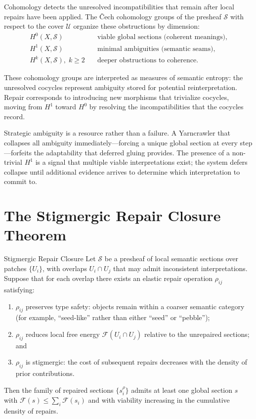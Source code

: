 Cohomology detects the unresolved incompatibilities that remain after local
repairs have been applied. The Čech cohomology groups of the presheaf
$\mathcal{S}$ with respect to the cover $\mathcal{U}$ organize these
obstructions by dimension:
\begin{align*}
  H^0(X, \mathcal{S}) &\quad \text{viable global sections (coherent meanings)}, \\
  H^1(X, \mathcal{S}) &\quad \text{minimal ambiguities (semantic seams)}, \\
  H^k(X, \mathcal{S}),\; k \geq 2 &\quad \text{deeper obstructions to coherence.}
\end{align*}

These cohomology groups are interpreted as measures of semantic entropy: the
unresolved cocycles represent ambiguity stored for potential reinterpretation. Repair
corresponds to introducing new morphisms that trivialize cocycles, moving from
$H^1$ toward $H^0$ by resolving the incompatibilities that the cocycles record.

\begin{remark}
Strategic ambiguity is a resource rather than a failure. A Yarncrawler that
collapses all ambiguity immediately---forcing a unique global section at every
step---forfeits the adaptability that deferred gluing provides. The presence of
a non-trivial $H^1$ is a signal that multiple viable interpretations exist; the
system defers collapse until additional evidence arrives to determine which
interpretation to commit to.
\end{remark}

\section{The Stigmergic Repair Closure Theorem}

\begin{theorem}{Stigmergic Repair Closure}
Let $\mathcal{S}$ be a presheaf of local semantic sections over patches
$\{U_i\}$, with overlaps $U_i \cap U_j$ that may admit inconsistent
interpretations. Suppose that for each overlap there exists an elastic repair
operation $\rho_{ij}$ satisfying:
\begin{enumerate}
  \item $\rho_{ij}$ preserves type safety: objects remain within a coarser
        semantic category (for example, ``seed-like'' rather than either
        ``seed'' or ``pebble'');
  \item $\rho_{ij}$ reduces local free energy $\mathcal{F}(U_i \cap U_j)$
        relative to the unrepaired sections; and
  \item $\rho_{ij}$ is stigmergic: the cost of subsequent repairs decreases
        with the density of prior contributions.
\end{enumerate}
Then the family of repaired sections $\{s^{\rho}_i\}$ admits at least one global
section $s$ with $\mathcal{F}(s) \leq \sum_i \mathcal{F}(s_i)$ and with viability
increasing in the cumulative density of repairs.
\end{theorem}


